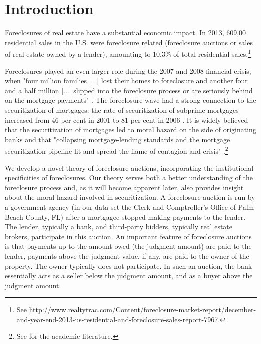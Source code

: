 \documentclass[11pt,twopage]{article}
\begin{document}
\section{Introduction}

Foreclosures of real estate have a substantial economic impact. In
2013, 609,00 residential sales in the U.S. were foreclosure related
(foreclosure auctions or sales of real estate owned by a lender),
amounting to 10.3\% of total residential sales.\footnote{See
  \url{http://www.realtytrac.com/Content/foreclosure-market-report/december-and-year-end-2013-us-residential-and-foreclosure-sales-report-7967}.}

Foreclosures played an even larger role during the 2007 and 2008
financial crisis, when "four million families [...] lost their homes
to foreclosure and another four and a half million [...] slipped into
the foreclosure process or are seriously behind on the mortgage
payments" \cite[p. xv]{angelides2011financial}. The foreclosure wave had
a strong connection to the securitization of mortgages: the rate of
securitization of subprime mortgages increased from 46 per cent in
2001 to 81 per cent in 2006 \cite[p. 19]{dewatripont2010balancing}. It is widely
believed that the securitization of mortgages led to moral hazard on
the side of originating banks and that "collapsing mortgage-lending
standards and the mortgage securitization pipeline lit and spread the
flame of contagion and crisis" \cite[p. xxiii]{angelides2011financial}.\footnote{See \cite{brunnermeier2009deciphering,mian2009consequences,keys2008did,tirole2011illiquidity} for the academic literature.}

We develop a novel theory of foreclosure auctions, incorporating the
institutional specificities of foreclosures. Our theory serves both a
better understanding of the foreclosure process and, as it will become
apparent later, also provides insight about the moral hazard involved
in securitization. A foreclosure auction is run by a government agency
(in our data set the Clerk and Comptroller's Office of Palm Beach
County, FL) after a mortgagee stopped making payments to the
lender. The lender, typically a bank, and third-party bidders,
typically real estate brokers, participate in this auction. An
important feature of foreclosure auctions is that payments up to the
amount owed (the judgment amount) are paid to the lender, payments
above the judgment value, if any, are paid to the owner of the
property. The owner typically does not participate. In such an
auction, the bank essentially acts as a seller below the judgment
amount, and as a buyer above the judgment amount.
\end{document}
